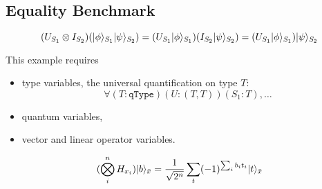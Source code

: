\subsection{Equality Benchmark}

\begin{example}
  $$
  (U_{S_1} \otimes I_{S_2}) (|\phi\rangle_{S_1} |\psi\rangle_{S_2}) = (U_{S_1} |\phi\rangle_{S_1}) (I_{S_2}|\psi\rangle_{S_2}) = (U_{S_1} |\phi\rangle_{S_1}) |\psi\rangle_{S_2}
  $$
\end{example}
This example requires 
\begin{itemize}
  \item type variables, the universal quantification on type $T$:
    $$
    \forall (T : \texttt{qType}) (U : (T, T)) (S_1 : T), \dots
    $$
  \item quantum variables,
  \item vector and linear operator variables.
\end{itemize}

\begin{example} [ParaHadamard]
  $$
  (\bigotimes_i^n H_{x_i}) |b\rangle_{\bar{x}} = \frac{1}{\sqrt{2^n}} \sum_t (-1)^{\sum_i b_i t_i} |t\rangle_{\bar{x}}
  $$
\end{example}

